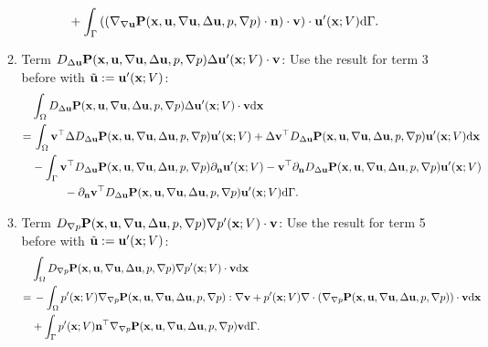 \documentclass[oneside,11pt]{book}
\numberwithin{equation}{section}
\begin{document}
\begin{enumerate}[leftmargin=0in]
\begin{enumerate}[leftmargin=0in]
\begin{align*}
            &+ \int_\Gamma \left(\left(\nabla_{\nabla{\bf u}}{\bf P}({\bf x},{\bf u},\nabla{\bf u},\Delta{\bf u},p,\nabla p)\cdot{\bf n}\right)\cdot{\bf v}\right)\cdot{\bf u}'({\bf x};V){\rm d}\Gamma.
        \end{align*}
        \item Term $D_{\Delta{\bf u}}{\bf P}({\bf x},{\bf u},\nabla{\bf u},\Delta{\bf u},p,\nabla p)\Delta{\bf u}'({\bf x};V)\cdot{\bf v}$: Use the result for term 3 before with $\tilde{\bf u} := {\bf u}'({\bf x};V)$:
        \begin{align*}
            &\int_\Omega D_{\Delta{\bf u}}{\bf P}({\bf x},{\bf u},\nabla{\bf u},\Delta{\bf u},p,\nabla p)\Delta{\bf u}'({\bf x};V)\cdot{\bf v}{\rm d}{\bf x}\\
            =&\, \int_\Omega {\bf v}^\top\Delta D_{\Delta{\bf u}}{\bf P}({\bf x},{\bf u},\nabla{\bf u},\Delta{\bf u},p,\nabla p){\bf u}'({\bf x};V) + \Delta{\bf v}^\top D_{\Delta{\bf u}}{\bf P}({\bf x},{\bf u},\nabla{\bf u},\Delta{\bf u},p,\nabla p){\bf u}'({\bf x};V){\rm d}{\bf x}\\
            &- \int_\Gamma {\bf v}^\top D_{\Delta{\bf u}}{\bf P}({\bf x},{\bf u},\nabla{\bf u},\Delta{\bf u},p,\nabla p)\partial_{\bf n}{\bf u}'({\bf x};V) - {\bf v}^\top\partial_{\bf n}D_{\Delta{\bf u}}{\bf P}({\bf x},{\bf u},\nabla{\bf u},\Delta{\bf u},p,\nabla p){\bf u}'({\bf x};V)\\
            &\hspace{1cm}- \partial_{\bf n}{\bf v}^\top D_{\Delta{\bf u}}{\bf P}({\bf x},{\bf u},\nabla{\bf u},\Delta{\bf u},p,\nabla p){\bf u}'({\bf x};V){\rm d}\Gamma.
        \end{align*}
        \item Term $D_{\nabla p}{\bf P}({\bf x},{\bf u},\nabla{\bf u},\Delta{\bf u},p,\nabla p)\nabla p'({\bf x};V)\cdot{\bf v}$: Use the result for term 5 before with $\tilde{\bf u} := {\bf u}'({\bf x};V)$:
        \begin{align*}
            &\int_\Omega D_{\nabla p}{\bf P}({\bf x},{\bf u},\nabla{\bf u},\Delta{\bf u},p,\nabla p)\nabla p'({\bf x};V)\cdot{\bf v}{\rm d}{\bf x}\\
            =&\, -\int_\Omega p'({\bf x};V)\nabla_{\nabla p}{\bf P}({\bf x},{\bf u},\nabla{\bf u},\Delta{\bf u},p,\nabla p):\nabla{\bf v} + p'({\bf x};V)\nabla\cdot\left(\nabla_{\nabla p}{\bf P}({\bf x},{\bf u},\nabla{\bf u},\Delta{\bf u},p,\nabla p)\right)\cdot{\bf v}{\rm d}{\bf x}\\
            &+ \int_\Gamma p'({\bf x};V){\bf n}^\top\nabla_{\nabla p}{\bf P}({\bf x},{\bf u},\nabla{\bf u},\Delta{\bf u},p,\nabla p){\bf v}{\rm d}\Gamma.

\end{align*}
\end{enumerate}
\end{enumerate}
\end{document}
